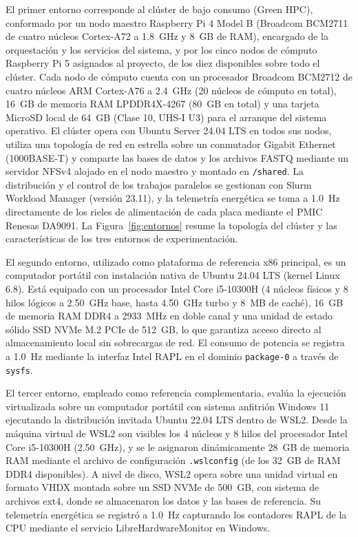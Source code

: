 \documentclass[12pt,oneside,spanish]{book}
\begin{document}
    El primer entorno corresponde al clúster de bajo consumo (Green HPC), conformado por un nodo maestro Raspberry Pi 4 Model B (Broadcom BCM2711 de cuatro núcleos Cortex-A72 a 1.8~GHz y 8~GB de RAM), encargado de la orquestación y los servicios del sistema, y por los cinco nodos de cómputo Raspberry Pi 5 asignados al proyecto, de los diez disponibles sobre todo el clúster. Cada nodo de cómputo cuenta con un procesador Broadcom BCM2712 de cuatro núcleos ARM Cortex-A76 a 2.4~GHz (20 núcleos de cómputo en total), 16~GB de memoria RAM LPDDR4X-4267 (80~GB en total) y una tarjeta MicroSD local de 64~GB (Clase 10, UHS-I U3) para el arranque del sistema operativo. El clúster opera con Ubuntu Server 24.04 LTS en todos sus nodos, utiliza una topología de red en estrella sobre un conmutador Gigabit Ethernet (1000BASE-T) y comparte las bases de datos y los archivos FASTQ mediante un servidor NFSv4 alojado en el nodo maestro y montado en \texttt{/shared}. La distribución y el control de los trabajos paralelos se gestionan con Slurm Workload Manager (versión 23.11), y la telemetría energética se toma a 1.0~Hz directamente de los rieles de alimentación de cada placa mediante el PMIC Renesas DA9091. La Figura~\ref{fig:entornos} resume la topología del clúster y las características de los tres entornos de experimentación.

    
    El segundo entorno, utilizado como plataforma de referencia x86 principal, es un computador portátil con instalación nativa de Ubuntu 24.04 LTS (kernel Linux 6.8). Está equipado con un procesador Intel Core i5-10300H (4 núcleos físicos y 8 hilos lógicos a 2.50~GHz base, hasta 4.50~GHz turbo y 8~MB de caché), 16~GB de memoria RAM DDR4 a 2933~MHz en doble canal y una unidad de estado sólido SSD NVMe M.2 PCIe de 512~GB, lo que garantiza acceso directo al almacenamiento local sin sobrecargas de red. El consumo de potencia se registra a 1.0~Hz mediante la interfaz Intel RAPL en el dominio \texttt{package-0} a través de \texttt{sysfs}.
    
    El tercer entorno, empleado como referencia complementaria, evalúa la ejecución virtualizada sobre un computador portátil con sistema anfitrión Windows 11 ejecutando la distribución invitada Ubuntu 22.04 LTS dentro de WSL2. Desde la máquina virtual de WSL2 son visibles los 4 núcleos y 8 hilos del procesador Intel Core i5-10300H (2.50~GHz), y se le asignaron dinámicamente 28~GB de memoria RAM mediante el archivo de configuración \texttt{.wslconfig} (de los 32~GB de RAM DDR4 disponibles). A nivel de disco, WSL2 opera sobre una unidad virtual en formato VHDX montada sobre un SSD NVMe de 500~GB, con sistema de archivos ext4, donde se almacenaron los datos y las bases de referencia. Su telemetría energética se registró a 1.0~Hz capturando los contadores RAPL de la CPU mediante el servicio LibreHardwareMonitor en Windows.
\end{document}
